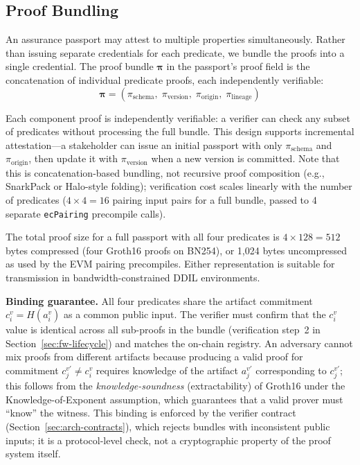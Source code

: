 \subsection{Proof Bundling}
\label{sec:fw-bundling}

An assurance passport may attest to multiple properties simultaneously.
Rather than issuing separate credentials for each predicate, we bundle the proofs into a single credential.
The proof bundle $\boldsymbol{\pi}$ in the passport's proof field is the concatenation of individual predicate proofs, each independently verifiable:
\begin{equation}
\label{eq:bundling}
\boldsymbol{\pi} = (\pi_{\text{schema}},\; \pi_{\text{version}},\; \pi_{\text{origin}},\; \pi_{\text{lineage}})
\end{equation}

Each component proof is independently verifiable: a verifier can check any subset of predicates without processing the full bundle.
This design supports incremental attestation---a stakeholder can issue an initial passport with only $\pi_{\text{schema}}$ and $\pi_{\text{origin}}$, then update it with $\pi_{\text{version}}$ when a new version is committed.
Note that this is concatenation-based bundling, not recursive proof composition (e.g., SnarkPack or Halo-style folding); verification cost scales linearly with the number of predicates ($4 \times 4 = 16$ pairing input pairs for a full bundle, passed to 4 separate \texttt{ecPairing} precompile calls).

The total proof size for a full passport with all four predicates is $4 \times 128 = 512$ bytes compressed (four Groth16 proofs on BN254), or 1{,}024 bytes uncompressed as used by the EVM pairing precompiles.
Either representation is suitable for transmission in bandwidth-constrained DDIL environments.

\textbf{Binding guarantee.}
All four predicates share the artifact commitment $c_i^{v} = H(a_i^{v})$ as a common public input.
The verifier must confirm that the $c_i^{v}$ value is identical across all sub-proofs in the bundle (verification step~2 in Section~\ref{sec:fw-lifecycle}) and matches the on-chain registry.
An adversary cannot mix proofs from different artifacts because producing a valid proof for commitment $c_j^{v'} \neq c_i^{v}$ requires knowledge of the artifact $a_j^{v'}$ corresponding to $c_j^{v'}$; this follows from the \emph{knowledge-soundness} (extractability) of Groth16 under the Knowledge-of-Exponent assumption, which guarantees that a valid prover must ``know'' the witness.
This binding is enforced by the verifier contract (Section~\ref{sec:arch-contracts}), which rejects bundles with inconsistent public inputs; it is a protocol-level check, not a cryptographic property of the proof system itself.

